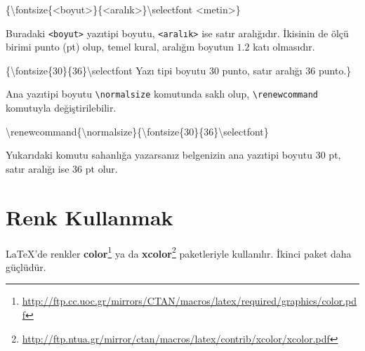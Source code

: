 \documentclass[
  10pt,
]{scrbook}
\newenvironment{Shaded}{\begin{snugshade}}{\end{snugshade}}
\newcommand{\ExtensionTok}[1]{#1}
\newcommand{\FunctionTok}[1]{\textcolor[rgb]{0.00,0.00,0.00}{#1}}
\newcommand{\NormalTok}[1]{#1}
\renewcommand{\href}[2]{#2\footnote{\url{#1}}}
\theoremstyle{definition}
\theoremstyle{definition}
\theoremstyle{definition}
\theoremstyle{definition}
\theoremstyle{remark}
\begin{document}
\begin{Shaded}
\begin{Highlighting}[]
\NormalTok{\{}\FunctionTok{\textbackslash{}fontsize}\NormalTok{\{\textless{}boyut\textgreater{}\}\{\textless{}aralık\textgreater{}\}}\FunctionTok{\textbackslash{}selectfont}\NormalTok{ \textless{}metin\textgreater{}\}}
\end{Highlighting}
\end{Shaded}

Buradaki \texttt{\textless{}boyut\textgreater{}} yazıtipi boyutu, \texttt{\textless{}aralık\textgreater{}} ise satır aralığıdır. İkisinin de ölçü birimi punto (pt) olup, temel kural, aralığın boyutun \(1.2\) katı olmasıdır.

\begin{Shaded}
\begin{Highlighting}[]
\NormalTok{\{}\FunctionTok{\textbackslash{}fontsize}\NormalTok{\{30\}\{36\}}\FunctionTok{\textbackslash{}selectfont}
\NormalTok{Yazı tipi boyutu 30 punto,}
\NormalTok{satır aralığı 36 punto.\}}
\end{Highlighting}
\end{Shaded}

Ana yazıtipi boyutu \texttt{\textbackslash{}normalsize} komutunda saklı olup, \texttt{\textbackslash{}renewcommand} komutuyla değiştirilebilir.

\begin{Shaded}
\begin{Highlighting}[]
\FunctionTok{\textbackslash{}renewcommand}\NormalTok{\{}\ExtensionTok{\textbackslash{}normalsize}\NormalTok{\}\{}\FunctionTok{\textbackslash{}fontsize}\NormalTok{\{30\}\{36\}}\FunctionTok{\textbackslash{}selectfont}\NormalTok{\}}
\end{Highlighting}
\end{Shaded}

Yukarıdaki komutu sahanlığa yazarsanız belgenizin ana yazıtipi boyutu 30 pt, satır aralığı ise 36 pt olur.

\hypertarget{renk-kullanmak}{%
\section{Renk Kullanmak}\label{renk-kullanmak}}

LaTeX'de renkler \href{http://ftp.cc.uoc.gr/mirrors/CTAN/macros/latex/required/graphics/color.pdf}{\textbf{color}} ya da \href{http://ftp.ntua.gr/mirror/ctan/macros/latex/contrib/xcolor/xcolor.pdf}{\textbf{xcolor}} paketleriyle kullanılır. İkinci paket daha güçlüdür.
\end{document}
